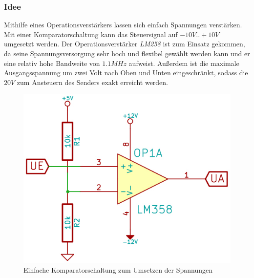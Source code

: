 \subsubsection{Idee} %
Mithilfe eines Operationsverstärkers lassen sich einfach Spannungen verstärken. Mit einer Komparatorschaltung kann das Steuersignal auf $-10V..+10V$ umgesetzt werden. Der Operationsverstärker \textit{LM258} ist zum Einsatz gekommen, da seine Spannungsversorgung sehr hoch und flexibel gewählt werden kann und er eine relativ hohe Bandweite von $1.1MHz$ aufweist. Außerdem ist die maximale Ausgangsspannung um zwei Volt nach Oben und Unten eingeschränkt, sodass die $20V$ zum Ansteuern des Senders exakt erreicht werden.
\begin{figure}[H]
\centering
\includegraphics[scale=0.5]{images/komparatorschaltung.jpg}
\caption{Einfache Komparatorschaltung zum Umsetzen der Spannungen} \label{img:I1}
\end{figure}

